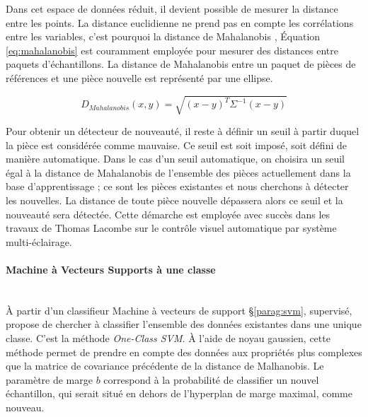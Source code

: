 Dans cet espace de données réduit, il devient possible de mesurer la distance entre les points.
La distance euclidienne ne prend pas en compte les corrélations entre les variables, c'est pourquoi la distance de Mahalanobis \cite{mahalanobis_generalised_1936}, Équation \ref{eq:mahalanobis}  est couramment employée pour mesurer des distances entre paquets d'échantillons.
La distance de Mahalanobis entre un paquet de pièces de références et une pièce nouvelle est représenté par une ellipse.

\begin{equation} \label{eq:mahalanobis}
D_{Mahalanobis}(x, y)=\sqrt{(x - y)^{T} \Sigma^{-1}(x-y)}
\end{equation}

Pour obtenir un détecteur de nouveauté, il reste à définir un seuil à partir duquel la pièce est considérée comme mauvaise.
Ce seuil est soit imposé, soit défini de manière automatique.
Dans le cas d'un seuil automatique, on choisira un seuil égal à la distance de Mahalanobis de l'ensemble des pièces actuellement dans la base d'apprentissage ; ce sont les pièces existantes et nous cherchons à détecter les nouvelles.
La distance de toute pièce nouvelle dépassera alors ce seuil et la nouveauté sera détectée.
Cette démarche est employée avec succès dans les travaux de Thomas Lacombe \cite{lacombe_exploitation_2018a} sur le contrôle visuel automatique par système multi-éclairage.

\paragraph{Machine à Vecteurs Supports à une classe}\mbox{} \\
À partir d'un classifieur Machine à vecteurs de support §\ref{parag:svm}, supervisé, \cite{scholkopf_support_1999, scholkopf_estimating_2001} propose de chercher à classifier l'ensemble des données existantes dans une unique classe.
C'est la méthode \textit{One-Class SVM}.
À l'aide de noyau gaussien, cette méthode permet de prendre en compte des données aux propriétés plus complexes que la matrice de covariance précédente de la distance de Malhanobis.
Le paramètre de marge $b$ correspond à la probabilité de classifier un nouvel échantillon, qui serait situé en dehors de l'hyperplan de marge maximal, comme nouveau.

